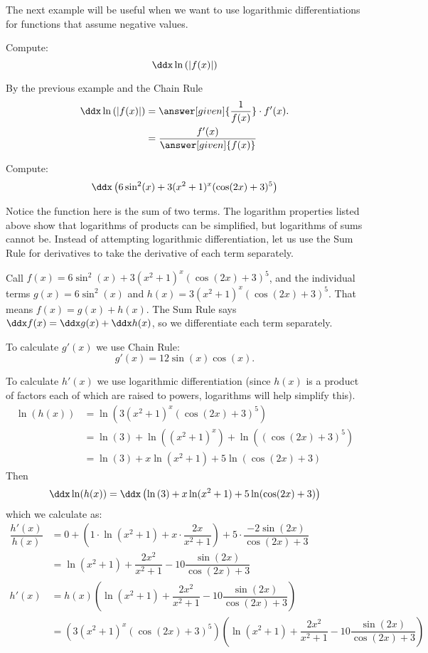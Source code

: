 \documentclass{ximera}
\begin{document}
The next  example will be useful when we want to use logarithmic differentiations for functions that  assume negative values. 


\begin{example}
	Compute:
	\[ \ddx\ln{(|f(x)|)} \]
	\begin{explanation}
		By the previous example and the Chain Rule
		\begin{align*}
			\ddx\ln{(|f(x)|)} &=\answer[given]{\frac{1}{f(x)}}\cdot f'(x).\\
				&=\frac{f'(x)}{\answer[given]{f(x)}}
		\end{align*}
	\end{explanation}
\end{example}

\begin{example}
	Compute:
	\[ \ddx \left( 6\sin^2(x) + 3(x^2+1)^x(\cos(2x) + 3)^5\right) \]
	
	\begin{explanation}
		Notice the function here is the sum of two terms. The logarithm properties listed above show that logarithms of products can be simplified, but logarithms of sums cannot be.
		Instead of attempting logarithmic differentiation, let us use the Sum Rule for derivatives to take the derivative of each term separately.
		
		Call $f(x) =  6\sin^2(x) + 3(x^2+1)^x(\cos(2x) + 3)^5$, and the individual terms $g(x) =  6\sin^2(x)$ and $h(x) =  3(x^2+1)^x(\cos(2x) + 3)^5$. That means $f(x) = g(x) + h(x)$.
		The Sum Rule says $\ddx f(x) = \ddx g(x) + \ddx h(x)$, so we differentiate each term separately. 
		
		To calculate $g'(x)$ we use Chain Rule: 
		\[ g'(x) = 12\sin(x)\cos(x). \]
		
		To calculate $h'(x)$ we use logarithmic differentiation (since $h(x)$ is a product of factors each of which are raised to powers, logarithms will help simplify this).
		\begin{align*}
			\ln( h(x) ) &= \ln\left( 3(x^2+1)^x(\cos(2x) + 3)^5 \right) \\
				&= \ln\left( 3\right) + \ln\left((x^2+1)^x\right) + \ln\left( (\cos(2x) + 3)^5 \right) \\
				&= \ln\left( 3\right) + x \ln(x^2+1) + 5 \ln(\cos(2x) + 3)
		\end{align*}
		Then 
		\[ \ddx \ln( h(x) ) = \ddx \left( \ln\left( 3\right) + x \ln(x^2+1) + 5 \ln(\cos(2x) + 3) \right) \]
		which we calculate as:
		\begin{align*}
				\dfrac{h'(x)}{h(x)} &= 0 + \left( 1\cdot \ln(x^2+1) + x\cdot  \dfrac{2x}{x^2+1}\right) + 5 \cdot \dfrac{-2\sin(2x)}{\cos(2x)+3}\\
						&=  \ln(x^2+1) + \dfrac{2x^2}{x^2+1} -10 \dfrac{\sin(2x)}{\cos(2x)+3}\\
				h'(x) &= h(x)\left(\ln(x^2+1) + \dfrac{2x^2}{x^2+1} -10 \dfrac{\sin(2x)}{\cos(2x)+3}\right)\\
					&= \left(3(x^2+1)^x(\cos(2x) + 3)^5\right)\left(\ln(x^2+1) + \dfrac{2x^2}{x^2+1} -10 \dfrac{\sin(2x)}{\cos(2x)+3}\right)
		\end{align*}
		

\end{explanation}
\end{example}
\end{document}
